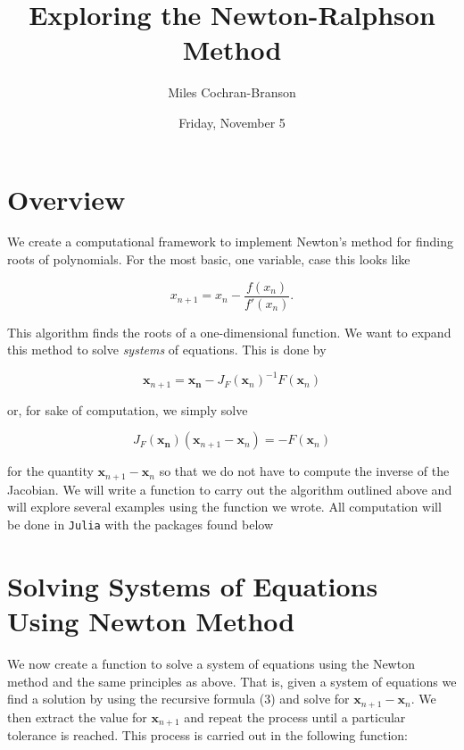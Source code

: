 \documentclass[11pt]{article}
\title{Exploring the Newton-Ralphson Method}
\author{Miles Cochran-Branson}
\date{Friday, November 5}
\begin{document}
    
\maketitle
    
\tableofcontents

\hypertarget{overview}{%
\section{Overview}\label{overview}}

We create a computational framework to implement Newton's method for
finding roots of polynomials. For the most basic, one variable, case
this looks like

\begin{equation}
x_{n + 1} = x_n - \frac{f(x_n)}{f'(x_n)}. 
\end{equation}

This algorithm finds the roots of a one-dimensional function. We want to
expand this method to solve \emph{systems} of equations. This is done by

\begin{equation}
\mathbf{x}_{n+1} = \mathbf{x_n} - J_F(\mathbf{x}_n)^{-1} F(\mathbf{x}_n)
\end{equation}

or, for sake of computation, we simply solve

\begin{equation}
J_F(\mathbf{x_n})(\mathbf{x}_{n+1} - \mathbf{x}_n) = -F(\mathbf{x}_n)
\end{equation}

for the quantity \(\mathbf{x}_{n+1} - \mathbf{x}_n\) so that we do not
have to compute the inverse of the Jacobian. We will write a function to
carry out the algorithm outlined above and will explore several examples
using the function we wrote. All computation will be done in
\texttt{Julia} with the packages found below



    \hypertarget{solving-systems-of-equations-using-newton-method}{%
\section{Solving Systems of Equations Using Newton
Method}\label{solving-systems-of-equations-using-newton-method}}

We now create a function to solve a system of equations using the Newton
method and the same principles as above. That is, given a system of
equations we find a solution by using the recursive formula (3) and solve for \(\mathbf{x}_{n+1} - \mathbf{x}_n\). We then extract the value for \(\mathbf{x}_{n + 1}\) and repeat the process until a
particular tolerance is reached. This process is carried out in the
following function:
\end{document}
